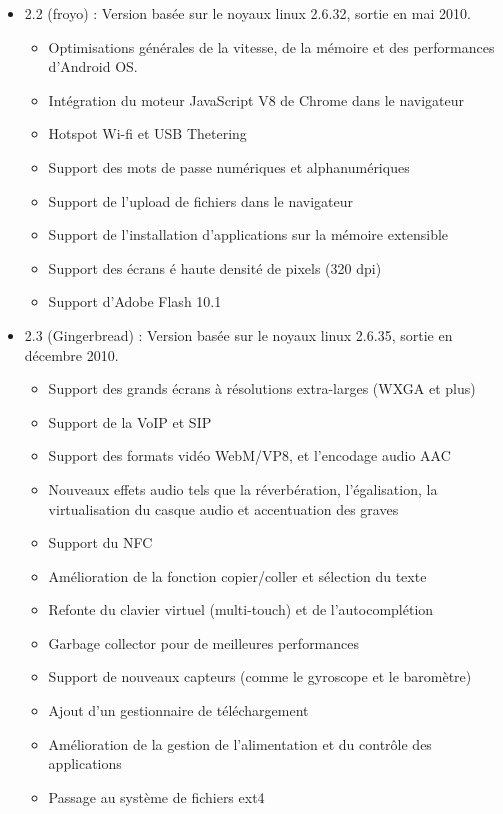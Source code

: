\begin{itemize}
  \item 2.2 (froyo) :
  Version basée sur le noyaux linux 2.6.32, sortie en mai 2010.
  \begin{itemize}
    \item Optimisations générales de la vitesse, de la mémoire et des performances
    d'Android OS.
    \item Intégration du moteur JavaScript V8 de Chrome dans le navigateur
    \item Hotspot Wi-fi et USB Thetering
    \item Support des mots de passe numériques et alphanumériques
    \item Support de l'upload de fichiers dans le navigateur
    \item Support de l'installation d'applications sur la mémoire extensible
    \item Support des écrans é haute densité de pixels (320 dpi)
    \item Support d'Adobe Flash 10.1
  \end{itemize}
  
  \item 2.3 (Gingerbread) :
  Version basée sur le noyaux linux 2.6.35, sortie en décembre 2010.
  \begin{itemize}
    \item Support des grands écrans à résolutions extra-larges (WXGA et plus)
    \item Support de la VoIP et SIP
    \item Support des formats vidéo WebM/VP8, et l'encodage audio AAC
    \item Nouveaux effets audio tels que la réverbération, l'égalisation, la
    virtualisation du casque audio et accentuation des graves
    \item Support du NFC
    \item Amélioration de la fonction copier/coller et sélection du texte
    \item Refonte du clavier virtuel (multi-touch) et de l'autocomplétion
    \item Garbage collector pour de meilleures performances
    \item Support de nouveaux capteurs (comme le gyroscope et le baromètre)
    \item Ajout d'un gestionnaire de téléchargement
    \item Amélioration de la gestion de l'alimentation et du contrôle des
    applications
    \item Passage au système de fichiers ext4
    \end{itemize}
\end{itemize}